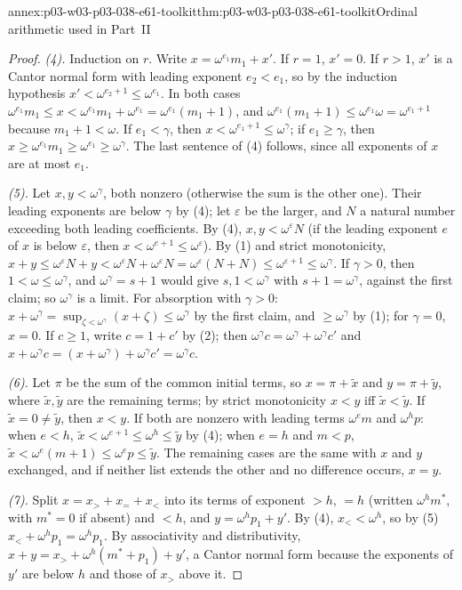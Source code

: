 \begin{annexitem}{annex:p03-w03-p03-038-e61-toolkit}{thm:p03-w03-p03-038-e61-toolkit}{Ordinal arithmetic used in Part~II}
\begin{proof}
\emph{(4).} Induction on \(r\). Write \(x=\omega^{e_1}m_1+x'\). If
\(r=1\), \(x'=0\). If \(r>1\), \(x'\) is a Cantor normal form with leading
exponent \(e_2<e_1\), so by the induction hypothesis
\(x'<\omega^{e_2+1}\le\omega^{e_1}\). In both cases
\(\omega^{e_1}m_1\le x<\omega^{e_1}m_1+\omega^{e_1}=\omega^{e_1}(m_1+1)\),
and \(\omega^{e_1}(m_1+1)\le\omega^{e_1}\omega=\omega^{e_1+1}\) because
\(m_1+1<\omega\). If \(e_1<\gamma\), then \(x<\omega^{e_1+1}\le
\omega^\gamma\); if \(e_1\ge\gamma\), then
\(x\ge\omega^{e_1}m_1\ge\omega^{e_1}\ge\omega^\gamma\). The last sentence
of (4) follows, since all exponents of \(x\) are at most \(e_1\).

\emph{(5).} Let \(x,y<\omega^\gamma\), both nonzero (otherwise the sum is
the other one). Their leading exponents are below \(\gamma\) by (4); let
\(\varepsilon\) be the larger, and \(N\) a natural number exceeding both
leading coefficients. By (4), \(x,y<\omega^\varepsilon N\) (if the leading
exponent \(e\) of \(x\) is below \(\varepsilon\), then
\(x<\omega^{e+1}\le\omega^\varepsilon\)). By (1) and strict monotonicity,
\(x+y\le\omega^\varepsilon N+y<\omega^\varepsilon N+\omega^\varepsilon N=
\omega^\varepsilon(N+N)\le\omega^{\varepsilon+1}\le\omega^\gamma\). If
\(\gamma>0\), then \(1<\omega\le\omega^\gamma\), and \(\omega^\gamma=s+1\)
would give \(s,1<\omega^\gamma\) with \(s+1=\omega^\gamma\), against the
first claim; so \(\omega^\gamma\) is a limit. For absorption with
\(\gamma>0\): \(x+\omega^\gamma=\sup_{\zeta<\omega^\gamma}(x+\zeta)
\le\omega^\gamma\) by the first claim, and \(\ge\omega^\gamma\) by (1);
for \(\gamma=0\), \(x=0\). If \(c\ge1\), write \(c=1+c'\) by (2); then
\(\omega^\gamma c=\omega^\gamma+\omega^\gamma c'\) and
\(x+\omega^\gamma c=(x+\omega^\gamma)+\omega^\gamma c'=\omega^\gamma c\).

\emph{(6).} Let \(\pi\) be the sum of the common initial terms, so
\(x=\pi+\tilde x\) and \(y=\pi+\tilde y\), where \(\tilde x,\tilde y\)
are the remaining terms; by strict monotonicity \(x<y\) iff
\(\tilde x<\tilde y\). If \(\tilde x=0\ne\tilde y\), then \(x<y\). If both
are nonzero with leading terms \(\omega^em\) and \(\omega^hp\): when
\(e<h\), \(\tilde x<\omega^{e+1}\le\omega^h\le\tilde y\) by (4); when
\(e=h\) and \(m<p\), \(\tilde x<\omega^e(m+1)\le\omega^ep\le\tilde y\).
The remaining cases are the same with \(x\) and \(y\) exchanged, and if
neither list extends the other and no difference occurs, \(x=y\).

\emph{(7).} Split \(x=x_>+x_=+x_<\) into its terms of exponent \(>h\),
\(=h\) (written \(\omega^hm^*\), with \(m^*=0\) if absent) and \(<h\), and
\(y=\omega^hp_1+y'\). By (4), \(x_<<\omega^h\), so by (5)
\(x_<+\omega^hp_1=\omega^hp_1\). By associativity and distributivity,
\(x+y=x_>+\omega^h(m^*+p_1)+y'\), a Cantor normal form because the
exponents of \(y'\) are below \(h\) and those of \(x_>\) above it.


\end{proof}
\end{annexitem}
